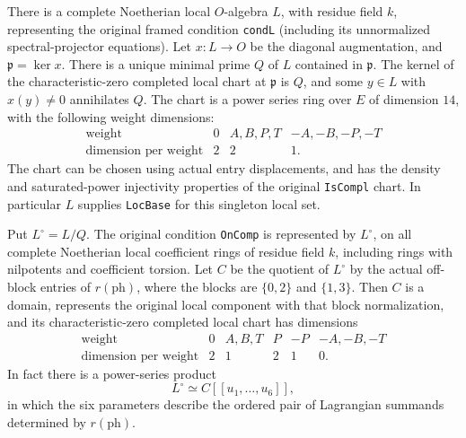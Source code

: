 \begin{theorem}
\label{thm:rh-symplectic-local}
There is a complete Noetherian local \(O\)-algebra \(L\), with residue
field \(k\), representing the original framed condition
\texttt{condL} (including its unnormalized spectral-projector
equations). Let \(x:L\to O\) be the diagonal augmentation, and
\(\mathfrak p=\ker x\).
There is a unique minimal prime \(Q\) of \(L\) contained in
\(\mathfrak p\). The kernel of the characteristic-zero completed
local chart at \(\mathfrak p\) is \(Q\), and some \(y\in L\) with
\(x(y)\ne0\) annihilates \(Q\). The chart is a power series ring
over \(E\) of dimension \(14\), with the following weight dimensions:
\[
 \begin{array}{c|ccc}
 \text{weight}&0&A,B,P,T&-A,-B,-P,-T\\ \hline
 \text{dimension per weight}&2&2&1 .
 \end{array}                                                   \tag{SM1}
\]
The chart can be chosen using actual entry displacements, and
has the density and saturated-power injectivity properties of
the original \texttt{IsCompl} chart. In particular \(L\) supplies
\texttt{LocBase} for this singleton local set.

Put \(L^\circ=L/Q\). The original condition \texttt{OnComp}
is represented by \(L^\circ\), on all complete Noetherian local
coefficient rings of residue field \(k\), including rings with
nilpotents and coefficient torsion.
Let \(C\) be the quotient of \(L^\circ\) by the actual off-block
entries of \(r(\mathrm{ph})\), where the blocks are
\(\{0,2\}\) and \(\{1,3\}\). Then \(C\) is a domain, represents
the original local component with that block normalization,
and its characteristic-zero completed local chart has dimensions
\[
 \begin{array}{c|ccccc}
 \text{weight}&0&A,B,T&P&-P&-A,-B,-T\\ \hline
 \text{dimension per weight}&2&1&2&1&0 .
 \end{array}                                                   \tag{SM2}
\]
In fact there is a power-series product
\[
 L^\circ \simeq C[[u_1,\ldots,u_6]],                            \tag{SM3}
\]
in which the six parameters describe the ordered pair of
Lagrangian summands determined by \(r(\mathrm{ph})\).
\end{theorem}

